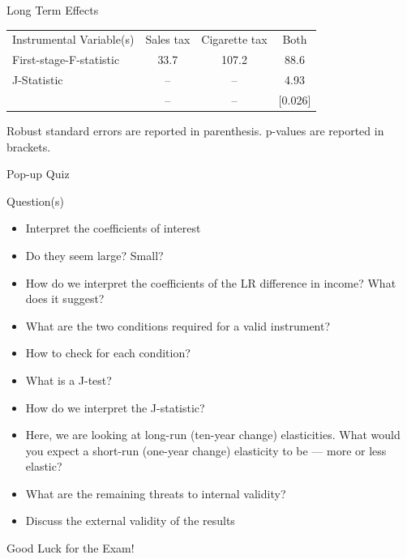 \documentclass[notes,10pt, aspectratio=169]{beamer}
\begin{document}
\begin{frame}{Long Term Effects}
\begin{table}[]
\begin{tabular}{l|ccc|}
\multicolumn{1}{|l|}{Instrumental Variable(s)}                                                                                 & Sales tax                                  & Cigarette tax                                  & Both                                    \\
\multicolumn{1}{|l|}{First-stage-F-statistic}                                                                                  & 33.7                                       & 107.2                                                   & 88.6                                    \\
\multicolumn{1}{|l|}{J-Statistic}                                                                                              & --                                         & --                                                      & 4.93                                    \\
\multicolumn{1}{|l|}{}                                                                                      & --                                         & --                                                    & [0.026]                                 \\ \hline
\end{tabular}
\end{table}
{\footnotesize Robust standard errors are reported in parenthesis. p-values are reported in brackets.}
\end{frame}

\begin{frame}{Pop-up Quiz}
\begin{exampleblock}{Question(s)}
    \begin{itemize}
        \item[1.] Interpret the coefficients of interest
        \item[2.] Do they seem large? Small?
        \item[3.] How do we interpret the coefficients of the LR difference in income? What does it suggest?
        \item[4.] What are the two conditions required for a valid instrument?
        \item[5.] How to check for each condition?
        \item[6.] What is a J-test? 
        \item[7.] How do we interpret the J-statistic?
        \item[8.] Here, we are looking at long-run (ten-year change) elasticities. What would you expect a short-run (one-year change) elasticity to be --- more or less elastic?
        \item[9.] What are the remaining threats to internal validity?
        \item[10.] Discuss the external validity of the results
    \end{itemize}
\end{exampleblock}

\end{frame}


\begin{frame}{}
\begin{center}
    {\Large Good Luck for the Exam!}
\end{center}
\end{frame}
\end{document}
